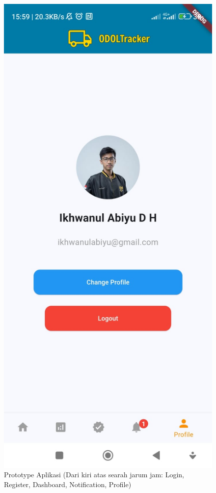 \begin{figure}[htbp]
  \includegraphics[scale=0.2]{gambar/bab3-profile.jpeg}

  \caption{Prototype Aplikasi (Dari kiri atas searah jarum jam: Login, Register, Dashboard, Notification, Profile)}
  \label{fig:prototype}
\end{figure}

